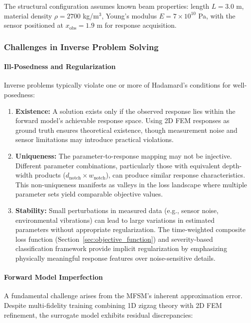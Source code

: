 \documentclass[12pt,a4paper]{report}
\begin{document}
The structural configuration assumes known beam properties: length $L = 3.0$ m, material density $\rho = 2700$ kg/m$^3$, Young's modulus $E = 7 \times 10^{10}$ Pa, with the sensor positioned at $x_{\text{obs}} = 1.9$ m for response acquisition.

\subsubsection{Challenges in Inverse Problem Solving}

\paragraph{Ill-Posedness and Regularization}
Inverse problems typically violate one or more of Hadamard's conditions for well-posedness:

\begin{enumerate}
    \item \textbf{Existence:} A solution exists only if the observed response lies within the forward model's achievable response space. Using 2D FEM responses as ground truth ensures theoretical existence, though measurement noise and sensor limitations may introduce practical violations.

    \item \textbf{Uniqueness:} The parameter-to-response mapping may not be injective. Different parameter combinations, particularly those with equivalent depth-width products ($d_{\text{notch}} \times w_{\text{notch}}$), can produce similar response characteristics. This non-uniqueness manifests as valleys in the loss landscape where multiple parameter sets yield comparable objective values.

    \item \textbf{Stability:} Small perturbations in measured data (e.g., sensor noise, environmental vibrations) can lead to large variations in estimated parameters without appropriate regularization. The time-weighted composite loss function (Section~\ref{sec:objective_function}) and severity-based classification framework provide implicit regularization by emphasizing physically meaningful response features over noise-sensitive details.
\end{enumerate}

\paragraph{Forward Model Imperfection}
A fundamental challenge arises from the MFSM's inherent approximation error. Despite multi-fidelity training combining 1D zigzag theory with 2D FEM refinement, the surrogate model exhibits residual discrepancies:
\end{document}

